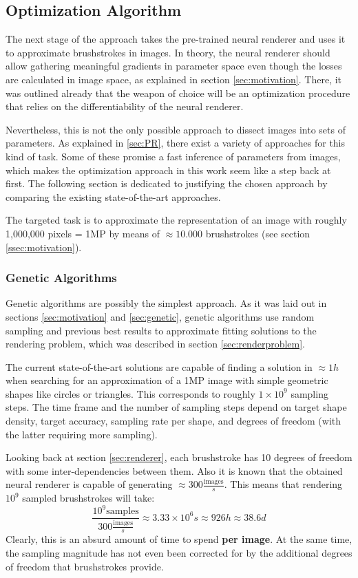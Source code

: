 \subsection{Optimization Algorithm}
The next stage of the approach takes the pre-trained neural renderer and uses it to approximate brushstrokes in images.
In theory, the neural renderer should allow gathering meaningful gradients in parameter space even though the losses are calculated in image space, as explained in section
\ref{sec:motivation}.
There, it was outlined already that the weapon of choice will be an optimization procedure that relies on the differentiability of the neural renderer.

Nevertheless, this is not the only possible approach to dissect images into sets of parameters.
As explained in \ref{sec:PR}, there exist a variety of approaches for this kind of task.
Some of these promise a fast inference of parameters from images, which makes the optimization approach in this work seem like a step back at first.
The following section is dedicated to justifying the chosen approach by comparing the existing state-of-the-art approaches.

The targeted task is to approximate the representation of an image with roughly 1,000,000 pixels =  1MP by means of $\approx 10.000$ brushstrokes (see section \ref{ssec:motivation}).

\subsubsection{Genetic Algorithms}
Genetic algorithms are possibly the simplest approach.
As it was laid out in sections \ref{sec:motivation} and \ref{sec:genetic}, genetic algorithms use random sampling and previous best results to approximate fitting solutions to the rendering problem, which was described in section \ref{sec:renderproblem}.

The current state-of-the-art solutions are capable of finding a solution in $\approx 1h$ when searching for an approximation of a 1MP image with simple geometric shapes like circles or triangles.
This corresponds to roughly $1 \times 10^{9}$ sampling steps.
The time frame and the number of sampling steps depend on target shape density, target accuracy, sampling rate per shape, and degrees of freedom (with the latter requiring more sampling).

Looking back at section \ref{sec:renderer}, each brushstroke has 10 degrees of freedom with some inter-dependencies between them.
Also it is known that the obtained neural renderer is capable of generating $\approx 300 \frac{\text{images}}{s}$.
This means that rendering $10^{9}$ sampled brushstrokes will take:
$$
\frac{10^{9} \text{samples}}{300 \frac{\text{images}}{s}} \approx 3.33 \times 10^{6} s
\approx 926 h \approx 38.6 d
$$
Clearly, this is an absurd amount of time to spend \textbf{per image}.
At the same time, the sampling magnitude has not even been corrected for by the additional degrees of freedom that brushstrokes provide.

